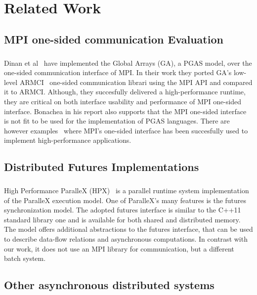 \chapter{Related Work}
\label{chap:related}

\section{MPI one-sided communication Evaluation}
\paragraph{}
Dinan et al~\cite{Dinan:2012:SGA:2357496.2358660}
have implemented the Global Arrays (GA)\cite{Nieplocha:2006:AAP:1125980.1125985}, a PGAS model, over the one-sided
communication interface of MPI.  In their work they ported GA's low-level ARMCI~\cite{Nieplocha99armci:a} one-sided
communication librari using the MPI API and compared it to ARMCI.  
Although, they succesfully delivered a high-performance runtime, they 
are critical on both interface usability and performance of MPI one-sided interface.  Bonachea in his report
\cite{Bonachea:mpi2} also supports that the MPI one-sided interface is not fit to be used for the implementation 
of PGAS languages.  There are however examples~\cite{A_hydra-mpi:an, Cui:2010:SES:1884643.1884646}
where MPI's one-sided interface has been succesfully used to implement high-performance applications.  

\section{Distributed Futures Implementations}
\paragraph{}
High Performance ParalleX (HPX)~\cite{HPX:TOBE} is a parallel runtime system 
implementation of the ParalleX\cite{Kaiser:2009:PAP:1678991.1679815} 
execution model.  One of ParalleX's many features is the futures synchronization model.
The adopted futures interface is similar to the C++11 standard library one and is available for both shared and distributed
memory.  The model offers additional abstractions to the futures interface, that can be used to describe data-flow relations
and asynchronous computations.
In contrast with our work, it does not use an MPI library for communication, but a different batch system.  

\section{Other asynchronous distributed systems}
